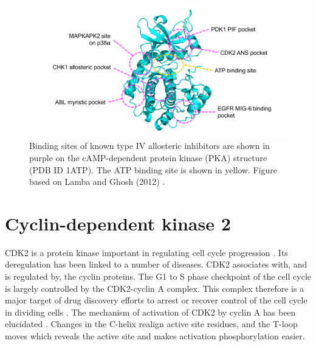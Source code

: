 \begin{figure}
\centering

\includegraphics[width=\textwidth]{figures/kinase_mods/kinase_mods}

\caption[Binding sites of known type IV allosteric inhibitors of protein kinases]
{Binding sites of known type IV allosteric inhibitors are shown in purple on the cAMP-dependent protein kinase (PKA) structure (PDB ID 1ATP).
The ATP binding site is shown in yellow.
Figure based on Lamba and Ghosh (2012) \cite{Lamba2012}.}

\label{fig:kinase_mods}
\end{figure}


\section{Cyclin-dependent kinase 2}
\label{sec:introduction_cdk2}

CDK2 is a protein kinase important in regulating cell cycle progression \cite{Peyressatre2015}.
Its deregulation has been linked to a number of diseases.
CDK2 associates with, and is regulated by, the cyclin proteins.
The G1 to S phase checkpoint of the cell cycle is largely controlled by the CDK2-cyclin A complex.
This complex therefore is a major target of drug discovery efforts to arrest or recover control of the cell cycle in dividing cells \cite{Betzi2011}.
The mechanism of activation of CDK2 by cyclin A has been elucidated \cite{Jeffrey1995}.
Changes in the \textalpha C-helix realign active site residues, and the T-loop moves which reveals the active site and makes activation phosphorylation easier.


